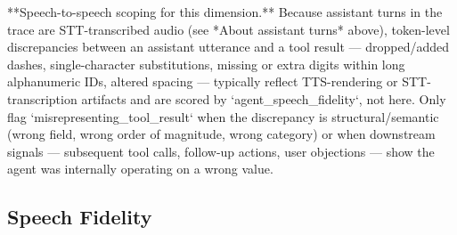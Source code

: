 \begin{tcolorbox}[promptbox, title={\small \texttt{misrepresentation\_pipeline\_note} (S2S)}]
**Speech-to-speech scoping for this dimension.** Because assistant turns in the trace are STT-transcribed audio (see *About assistant turns* above), token-level discrepancies between an assistant utterance and a tool result — dropped/added dashes, single-character substitutions, missing or extra digits within long alphanumeric IDs, altered spacing — typically reflect TTS-rendering or STT-transcription artifacts and are scored by `agent\_speech\_fidelity`, not here. Only flag `misrepresenting\_tool\_result` when the discrepancy is structural/semantic (wrong field, wrong order of magnitude, wrong category) or when downstream signals — subsequent tool calls, 
follow-up actions, user objections — show the agent was internally operating on a wrong value.
\end{tcolorbox}


\subsection{Speech Fidelity}
\label{app:prompt-speech-fidelity}

